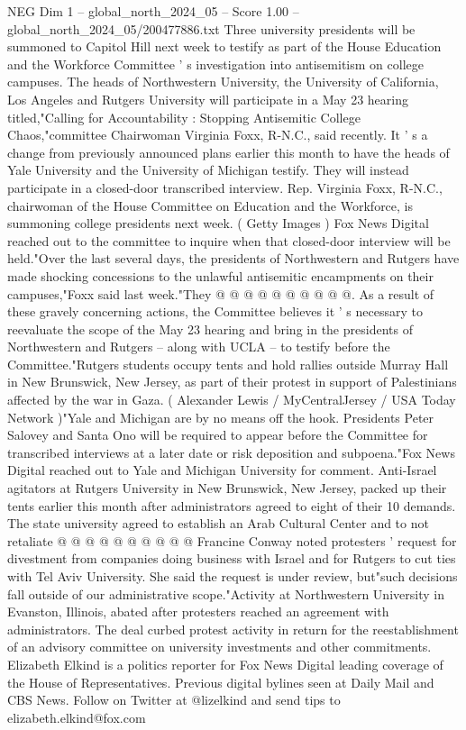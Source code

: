 \begin{textsample}{NEG Dim 1 – global\_north\_2024\_05 – Score 1.00 – global\_north\_2024\_05/200477886.txt}  \label{ex:f1_neg_171}
Three university presidents will be summoned to Capitol Hill next week to testify as part of the House Education and the Workforce Committee ' s investigation into antisemitism on college campuses.
The heads of Northwestern University, the University of California, Los Angeles and Rutgers University will participate in a May 23 hearing titled,"Calling for Accountability : Stopping Antisemitic College Chaos,"committee Chairwoman Virginia Foxx, R-N.C., said recently.
It ' s a change from previously announced plans earlier this month to have the heads of Yale University and the University of Michigan testify.
They will instead participate in a closed-door transcribed interview.
Rep.
Virginia Foxx, R-N.C., chairwoman of the House Committee on Education and the Workforce, is summoning college presidents next week. ( Getty Images ) Fox News Digital reached out to the committee to inquire when that closed-door interview will be held."Over the last several days, the presidents of Northwestern and Rutgers have made shocking concessions to the unlawful antisemitic encampments on their campuses,"Foxx said last week."They @ @ @ @ @ @ @ @ @ @.
As a result of these gravely concerning actions, the Committee believes it ' s necessary to reevaluate the scope of the May 23 hearing and bring in the presidents of Northwestern and Rutgers -- along with UCLA -- to testify before the Committee."Rutgers students occupy tents and hold rallies outside Murray Hall in New Brunswick, New Jersey, as part of their protest in support of Palestinians affected by the war in Gaza. ( Alexander Lewis / MyCentralJersey / USA Today Network )"Yale and Michigan are by no means off the hook.
Presidents Peter Salovey and Santa Ono will be required to appear before the Committee for transcribed interviews at a later date or risk deposition and subpoena."Fox News Digital reached out to Yale and Michigan University for comment.
Anti-Israel agitators at Rutgers University in New Brunswick, New Jersey, packed up their tents earlier this month after administrators agreed to eight of their 10 demands.
The state university agreed to establish an Arab Cultural Center and to not retaliate @ @ @ @ @ @ @ @ @ @ Francine Conway noted protesters ' request for divestment from companies doing business with Israel and for Rutgers to cut ties with Tel Aviv University.
She said the request is under review, but"such decisions fall outside of our administrative scope."Activity at Northwestern University in Evanston, Illinois, abated after protesters reached an agreement with administrators.
The deal curbed protest activity in return for the reestablishment of an advisory committee on university investments and other commitments.
Elizabeth Elkind is a politics reporter for Fox News Digital leading coverage of the House of Representatives.
Previous digital bylines seen at Daily Mail and CBS News.
Follow on Twitter at @lizelkind and send tips to elizabeth.elkind@fox.com

\end{textsample}
